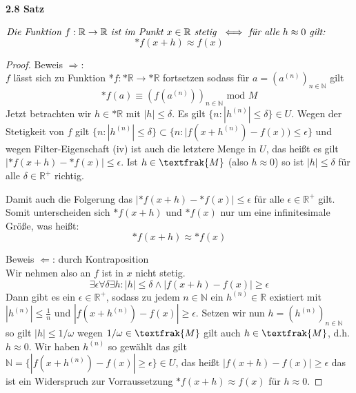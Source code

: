 \documentclass[a4paper]{article}
\begin{document}
\paragraph{2.8 Satz} $ \textit{Die Funktion } f:\mathbb{R} \to \mathbb{R} \textit{ ist im Punkt } x \in \mathbb{R} \textit{ stetig }
\iff \\ \textit{ für alle } h \approx 0 \textit{ gilt:} $
$$ \text{*}f(x + h) \approx f(x) $$ 
\begin{proof}
      Beweis $ \Rightarrow $: \\
      $ f $ lässt sich zu Funktion *$f: \text{*}\mathbb{R} \to \text{*}\mathbb{R} $ fortsetzen sodass für 
      $ a = (a^{(n)})_{n\in\mathbb{N}} $ gilt 
      $$ \text{*}f(a) \equiv (f(a^{(n)}))_{n\in\mathbb{N}} \text{ mod } M $$
      Jetzt betrachten wir $ h \in \text{*}\mathbb{R} $ mit $ |h| \leqslant \delta $.
      Es gilt $ \{n: |h^{(n)}| \leqslant \delta\} \in U $. Wegen der Stetigkeit von $ f $ gilt
      $ \{n: |h^{(n)}| \leqslant \delta\} \subset \{n: |f(x + h^{(n)}) - f(x)) \leqslant \epsilon\} $ 
      und wegen Filter-Eigenschaft (iv) ist auch die letztere Menge in $ U $, das 
      heißt es gilt $ |\text{*}f(x + h) - \text{*}f(x)| \leqslant \epsilon $. Ist $ h \in \textfrak{M} $ 
      (also $ h \approx 0 $) so ist $ |h| \leqslant \delta $ für alle $ \delta \in \mathbb{R}^+ $ richtig. 

      Damit auch die Folgerung das $ |\text{*}f(x + h) - \text{*}f(x)| \leqslant \epsilon $ für alle
      $ \epsilon \in  \mathbb{R}^+ $ gilt. Somit unterscheiden sich $ \text{*}f(x + h) $ und $  \text{*}f(x) $ nur
      um eine infinitesimale Größe, was heißt:
      $$ \text{*}f(x + h) \approx *f(x) $$

      Beweis $ \Leftarrow $: durch Kontraposition \\
      Wir nehmen also an $ f $ ist in $ x $ nicht stetig. 
      $$ \exists \epsilon \forall \delta \exists h: |h| \leqslant \delta \wedge |f(x + h) - f(x)| \geq \epsilon $$
      Dann gibt es ein $ \epsilon \in \mathbb{R}^+ $, sodass 
      zu jedem $ n \in \mathbb{N} $ ein $ h^{(n)} \in \mathbb{R} $ existiert mit $ |h^{(n)}| \leqslant \frac{1}{n} $
      und $ |f(x + h^{(n)}) - f(x)| \geq \epsilon $. 
      Setzen wir nun $ h = (h^{(n)})_{n\in\mathbb{N}} $ so gilt $ |h| \leqslant 1/\omega $ wegen 
      $ 1/\omega \in \textfrak{M} $ gilt auch $ h \in \textfrak{M} $, d.h. $ h \approx 0 $.
      Wir haben $ h^{(n)} $ so gewählt das gilt $ \mathbb{N} = \{ |f(x + h^{(n)}) - f(x)| \geq \epsilon \} \in U $,
      das heißt $ |f(x + h) - f(x)| \geq \epsilon $ das ist ein Widerspruch zur Vorraussetzung 
      $\text{*}f(x + h) \approx f(x) $ für $ h \approx 0$. 


\end{proof}
\end{document}
